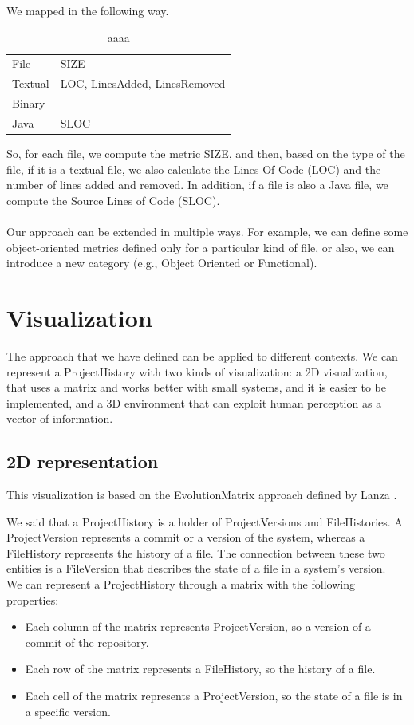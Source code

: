 We mapped in the following way.

\begin{table}[]
    \begin{tabular}{ll}
    File    & SIZE      \\
    Textual & LOC, LinesAdded, LinesRemoved \\
    Binary  &           \\
    Java    & SLOC
    \end{tabular}
    \caption[]{aaaa}
\end{table}

So, for each file, we compute the metric SIZE, and then, based on the type of the file, if it is a textual file, we also calculate the Lines Of Code (LOC) and the number of lines added and removed. 
In addition, if a file is also a Java file, we compute the Source Lines of Code (SLOC). \\
\\
Our approach can be extended in multiple ways. 
For example, we can define some object-oriented metrics defined only for a particular kind of file, or also, we can introduce a new category (e.g., Object Oriented or Functional). 

\section{Visualization}
The approach that we have defined can be applied to different contexts. 
We can represent a ProjectHistory with two kinds of visualization: a 2D visualization,
 that uses a matrix and works better with small systems, and it is easier to be implemented,
  and a 3D environment that can exploit human perception as a vector of information. 


\subsection*{2D representation}
This visualization is based on the EvolutionMatrix approach defined by Lanza \cite{Lanza2001}. 

We said that a ProjectHistory is a holder of ProjectVersions and FileHistories. 
A ProjectVersion represents a commit or a version of the system, whereas a FileHistory represents the history of a file. 
The connection between these two entities is a FileVersion that describes the state of a file in a system's version. \\
\bigbreak
We can represent a ProjectHistory through a matrix with the following properties: 
\begin{itemize}
    \item Each column of the matrix represents ProjectVersion, so a version of a commit of the repository. 
    \item Each row of the matrix represents a FileHistory, so the history of a file. 
    \item Each cell of the matrix represents a ProjectVersion, so the state of a file is in a specific version. 
\end{itemize}

